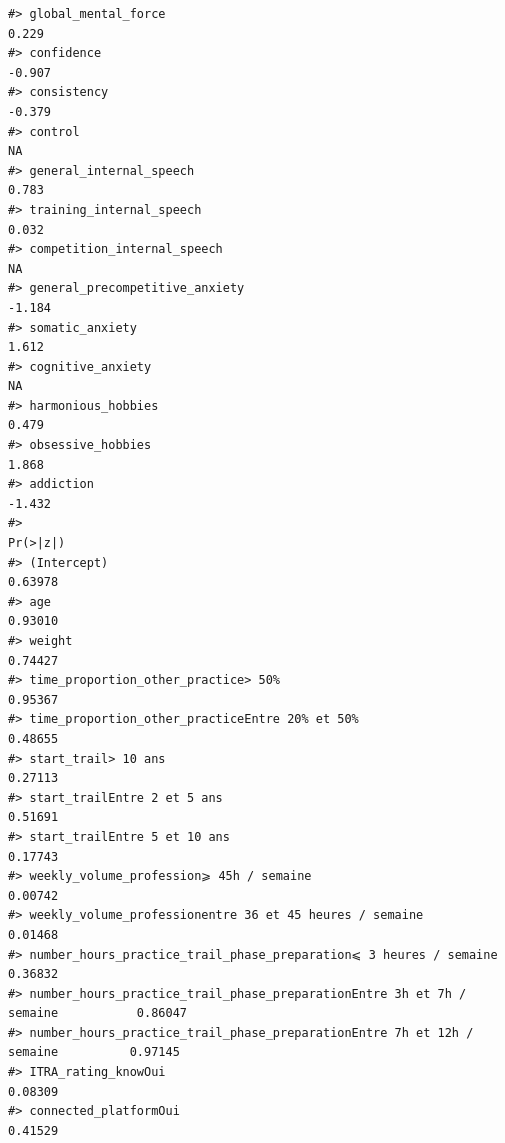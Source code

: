 \documentclass[
]{article}
\begin{document}
\begin{verbatim}
#> global_mental_force                                                              0.229
#> confidence                                                                      -0.907
#> consistency                                                                     -0.379
#> control                                                                             NA
#> general_internal_speech                                                          0.783
#> training_internal_speech                                                         0.032
#> competition_internal_speech                                                         NA
#> general_precompetitive_anxiety                                                  -1.184
#> somatic_anxiety                                                                  1.612
#> cognitive_anxiety                                                                   NA
#> harmonious_hobbies                                                               0.479
#> obsessive_hobbies                                                                1.868
#> addiction                                                                       -1.432
#>                                                                                Pr(>|z|)
#> (Intercept)                                                                     0.63978
#> age                                                                             0.93010
#> weight                                                                          0.74427
#> time_proportion_other_practice> 50%                                             0.95367
#> time_proportion_other_practiceEntre 20% et 50%                                  0.48655
#> start_trail> 10 ans                                                             0.27113
#> start_trailEntre 2 et 5 ans                                                     0.51691
#> start_trailEntre 5 et 10 ans                                                    0.17743
#> weekly_volume_profession⩾ 45h / semaine                                         0.00742
#> weekly_volume_professionentre 36 et 45 heures / semaine                         0.01468
#> number_hours_practice_trail_phase_preparation⩽ 3 heures / semaine               0.36832
#> number_hours_practice_trail_phase_preparationEntre 3h et 7h / semaine           0.86047
#> number_hours_practice_trail_phase_preparationEntre 7h et 12h / semaine          0.97145
#> ITRA_rating_knowOui                                                             0.08309
#> connected_platformOui                                                           0.41529

\end{verbatim}
\end{document}

